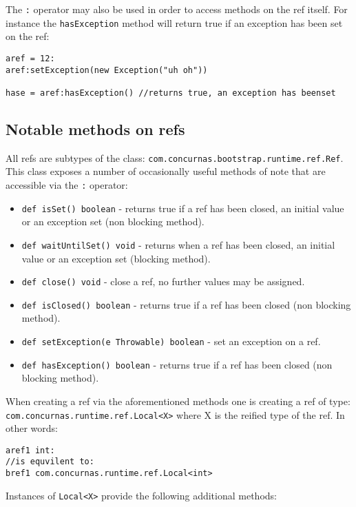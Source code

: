 \documentclass[conc-doc]{subfiles}
\begin{document}
The \lstinline{:} operator may also be used in order to access methods on the ref itself. For instance the \lstinline{hasException} method will return true if an exception has been set on the ref:

\begin{lstlisting}
aref = 12:
aref:setException(new Exception("uh oh"))

hase = aref:hasException() //returns true, an exception has beenset
\end{lstlisting}


\subsection{Notable methods on refs}
All refs are subtypes of the class: \lstinline{com.concurnas.bootstrap.runtime.ref.Ref}. This class exposes a number of occasionally useful methods of note that are accessible via the \lstinline{:} operator:

\begin{itemize}
	\item \lstinline{def isSet() boolean} - returns true if a ref has been closed, an initial value or an exception set (non blocking method).
	\item \lstinline{def waitUntilSet() void} - returns when a ref has been closed, an initial value or an exception set (blocking method).
	\item \lstinline{def close() void} - close a ref, no further values may be assigned.
	\item \lstinline{def isClosed() boolean} - returns true if a ref has been closed (non blocking method).
	\item \lstinline{def setException(e Throwable) boolean} - set an exception on a ref.
	\item \lstinline{def hasException() boolean} - returns true if a ref has been closed (non blocking method).
\end{itemize}

\begin{sloppypar}
When creating a ref via the aforementioned methods one is creating a ref of type: \lstinline{com.concurnas.runtime.ref.Local<X>} where X is the reified type of the ref. In other words:

\begin{lstlisting}
aref1 int:
//is equvilent to:
bref1 com.concurnas.runtime.ref.Local<int>
\end{lstlisting}

Instances of \lstinline{Local<X>} provide the following additional methods:
\end{sloppypar}
\end{document}
